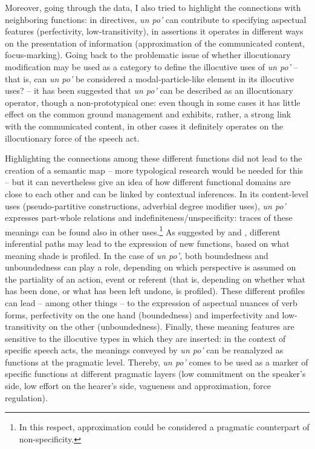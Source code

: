Moreover, going through the data, I also tried to highlight the connections with neighboring functions: in directives, \textit{un po’} can contribute to specifying aspectual features (perfectivity, low-transitivity), in assertions it operates in different ways on the presentation of information (approximation of the communicated content, focus-marking). Going back to the problematic issue of whether illocutionary modification may be used as a category to define the illocutive uses of \textit{un po’} – that is, can \textit{un po’} be considered a modal-particle-like element in its illocutive uses? – it has been suggested that \textit{un po’} can be described as an illocutionary operator, though a non-prototypical one: even though in some cases it has little effect on the common ground management and exhibits, rather, a strong link with the communicated content, in other cases it definitely operates on the illocutionary force of the speech act.

Highlighting the connections among these different functions did not lead to the creation of a semantic map – more typological research would be needed for this – but it can nevertheless give an idea of how different functional domains are close to each other and can be linked by contextual inferences. In its content-level uses (pseudo-partitive constructions, adverbial degree modifier uses), \textit{un po’} expresses part-whole relations and indefiniteness/unspecificity: traces of these meanings can be found also in other uses.\footnote{In this respect, approximation could be considered a pragmatic counterpart of non-specificity.} As suggested by \citet{LuraghiKittilä2014} and \citet{Budd2014}, different inferential paths may lead to the expression of new functions, based on what meaning shade is profiled. In the case of \textit{un po’,} both boundedness and unboundedness can play a role, depending on which perspective is assumed on the partiality of an action, event or referent (that is, depending on whether what has been done, or what has been left undone, is profiled). These different profiles can lead – among other things – to the expression of aspectual nuances of verb forms, perfectivity on the one hand (boundedness) and imperfectivity and low-transitivity on the other (unboundedness). Finally, these meaning features are sensitive to the illocutive types in which they are inserted: in the context of specific speech acts, the meanings conveyed by \textit{un po’} can be reanalyzed as functions at the pragmatic level. Thereby, \textit{un po’} comes to be used as a marker of specific functions at different pragmatic layers (low commitment on the speaker’s side, low effort on the hearer’s side, vagueness and approximation, force regulation).

